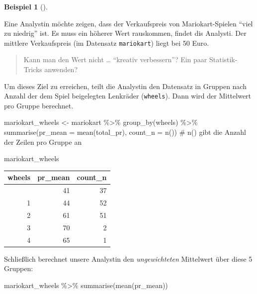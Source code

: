 \documentclass[
  a4paper,
  DIV=11]{scrreprt}
\newenvironment{Shaded}{\begin{snugshade}}{\end{snugshade}}
\newcommand{\AttributeTok}[1]{\textcolor[rgb]{0.40,0.45,0.13}{#1}}
\newcommand{\CommentTok}[1]{\textcolor[rgb]{0.37,0.37,0.37}{#1}}
\newcommand{\FunctionTok}[1]{\textcolor[rgb]{0.28,0.35,0.67}{#1}}
\newcommand{\NormalTok}[1]{\textcolor[rgb]{0.00,0.23,0.31}{#1}}
\newcommand{\OtherTok}[1]{\textcolor[rgb]{0.00,0.23,0.31}{#1}}
\newcommand{\SpecialCharTok}[1]{\textcolor[rgb]{0.37,0.37,0.37}{#1}}
\theoremstyle{definition}
\theoremstyle{definition}
\newtheorem{example}{Beispiel}[chapter]
\theoremstyle{definition}
\theoremstyle{remark}
\begin{document}
\begin{example}[]\protect\hypertarget{exm-luege-filter}{}\label{exm-luege-filter}

Eine Analystin {} möchte zeigen, dass der Verkaufspreis von
Mariokart-Spielen ``viel zu niedrig'' ist. Es muss ein höherer Wert
rauskommen, findet dis Analysti. Der mittlere Verkaufspreis (im
Datensatz \texttt{mariokart}) liegt bei 50 Euro.

\begin{quote}
{} Kann man den Wert nicht \ldots{} ``kreativ verbessern''?
Ein paar Statistik-Tricks anwenden?
\end{quote}

Um dieses Ziel zu erreichen, teilt die Analystin den Datensatz in
Gruppen nach Anzahl der dem Spiel beigelegten Lenkräder
(\texttt{wheels}). Dann wird der Mittelwert pro Gruppe berechnet.

\begin{Shaded}
\begin{Highlighting}[]
\NormalTok{mariokart\_wheels }\OtherTok{\textless{}{-}} 
\NormalTok{mariokart }\SpecialCharTok{\%\textgreater{}\%} 
  \FunctionTok{group\_by}\NormalTok{(wheels) }\SpecialCharTok{\%\textgreater{}\%} 
  \FunctionTok{summarise}\NormalTok{(}\AttributeTok{pr\_mean =} \FunctionTok{mean}\NormalTok{(total\_pr),}
            \AttributeTok{count\_n =} \FunctionTok{n}\NormalTok{())  }\CommentTok{\# n() gibt die Anzahl der Zeilen pro Gruppe an}

\NormalTok{mariokart\_wheels}
\end{Highlighting}
\end{Shaded}

\begin{longtable}[]{@{}rrr@{}}
\toprule\noalign{}
wheels & pr\_mean & count\_n \\
\midrule\noalign{}
\endhead
\bottomrule\noalign{}
\endlastfoot
0 & 41 & 37 \\
1 & 44 & 52 \\
2 & 61 & 51 \\
3 & 70 & 2 \\
4 & 65 & 1 \\
\end{longtable}

Schließlich berechnet unsere Analystin den \emph{ungewichteten}
Mittelwert über diese 5 Gruppen:

\begin{Shaded}
\begin{Highlighting}[]
\NormalTok{mariokart\_wheels }\SpecialCharTok{\%\textgreater{}\%} 
  \FunctionTok{summarise}\NormalTok{(}\FunctionTok{mean}\NormalTok{(pr\_mean))}
\end{Highlighting}
\end{Shaded}


\end{example}
\end{document}
